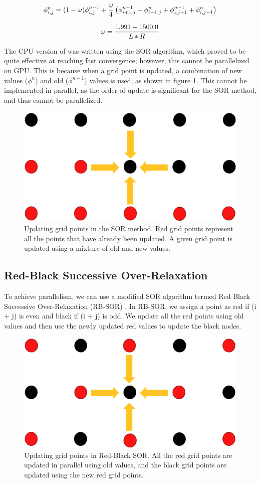 \begin{equation}{\label{sor_eq}}
 \phi_{i,j}^{n} = (1-\omega)\phi^{n-1}_{i,j} + \frac{\omega}{4} \left(\phi^{n-1}_{i+1,j} + \phi^n_{i-1,j} + \phi^{n-1}_{i,j+1} + \phi^n_{i,j-1} \right)
\end{equation}


\begin{equation}{\label{omg}}
\omega = \frac{1.991 - 1500.0}{L*R}
\end{equation}

The CPU version of {\ehd} was written using the SOR algorithm, which proved to be quite effective at reaching fast convergence; however, this cannot be parallelized on GPU. This is because when a grid point is updated, a combination of new values ($\phi^{n}$) and old ($\phi^{n-1}$) values is used, as shown in figure \ref{fig:sor_methods}. This cannot be implemented in parallel, as the order of update is significant for the SOR method, and thus cannot be parallelized.


\begin{figure}[!htb]
\centering
 \vspace{0.2cm}
\includegraphics[width=0.4\linewidth]{ch4/figs/SOR.png}
\vspace{0.3cm}
\caption{\label{fig:sor_methods} Updating grid points in the SOR method. Red grid points represent all the points that have already been updated. A given grid point is updated using a mixture of old and new values.}
\end{figure}

\subsection*{Red-Black Successive Over-Relaxation}
To achieve parallelism, we can use a modified SOR algorithm termed Red-Black Successive Over-Relaxation (RB-SOR) \cite{Alefeld1982}. In RB-SOR, we assign a point as red if (i + j) is even and black if (i + j) is odd. We update all the red points using old values and then use the newly updated red values to update the black nodes.

\begin{figure}[!htb]
\centering
 \vspace{0.2cm}
 \includegraphics[width=0.4\linewidth]{ch4/figs/RB-SOR.png}
 \vspace{0.3cm}
\caption{\label{fig:rb_sor_methods} Updating grid points in Red-Black SOR. All the red grid points are updated in parallel using old values, and the black grid points are updated using the new red grid points.}
\end{figure}

